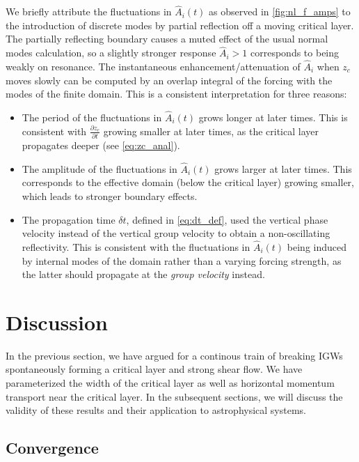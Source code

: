 \documentclass[
        fleqn,
        usenatbib,
    ]{mnras}
\newcommand*{\pd}[2]{\frac{\partial#1}{\partial#2}}
\begin{document}
We briefly attribute the fluctuations in $\hat{A}_i(t)$ as observed in
\autoref{fig:nl_f_amps} to the introduction of discrete modes by partial
reflection off a moving critical layer. The partially reflecting boundary causes
a muted effect of the usual normal modes calculation, so a slightly stronger
response $\hat{A}_i > 1$ corresponds to being weakly on resonance. The
instantaneous enhancement/attenuation of $\hat{A}_i$ when $z_c$ moves slowly can
be computed by an overlap integral of the forcing with the modes of the finite
domain. This is a consistent interpretation for three reasons:
\begin{itemize}
    \item The period of the fluctuations in $\hat{A}_i(t)$ grows longer at later
        times. This is consistent with $\pd{z_c}{t}$ growing smaller at later
        times, as the critical layer propagates deeper (see
        \autoref{eq:zc_anal}).

    \item The amplitude of the fluctuations in $\hat{A}_i(t)$ grows larger at
        later times. This corresponds to the effective domain (below the
        critical layer) growing smaller, which leads to stronger boundary
        effects.

    \item The propagation time $\delta t$, defined in \autoref{eq:dt_def}, used
        the vertical phase velocity instead of the vertical group velocity to
        obtain a non-oscillating reflectivity. This is consistent with the
        fluctuations in $\hat{A}_i(t)$ being induced by internal modes of the
        domain rather than a varying forcing strength, as the latter should
        propagate at the \emph{group velocity} instead.
\end{itemize}

\section{Discussion}\label{s:discussion}

In the previous section, we have argued for a continous train of breaking IGWs
spontaneously forming a critical layer and strong shear flow. We have
parameterized the width of the critical layer as well as horizontal momentum
transport near the critical layer. In the subsequent sections, we will discuss
the validity of these results and their application to astrophysical systems.

\subsection{Convergence}\label{ss:convergence}
\end{document}
